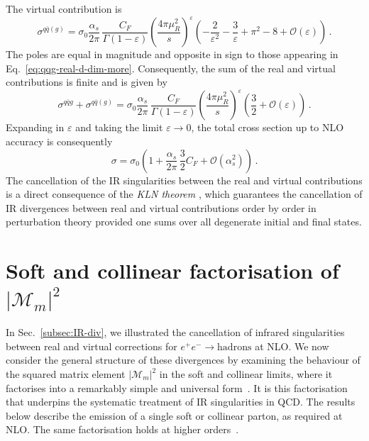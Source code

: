 The virtual contribution is
\begin{equation}
   \sigma^{q\bar{q}(g)}=\sigma_0\frac{\alpha_s}{2\pi}\,
      \frac{C_F}{\Gamma(1-\varepsilon)}
      \left(\frac{4\pi\mu_R^2}{s}\right)^{\varepsilon}
      \left(
         -\frac{2}{\varepsilon^2}
         -\frac{3}{\varepsilon}
         + \pi^2
         - 8
         + \mathcal{O}(\varepsilon)
      \right)\,.
\end{equation}
The poles are equal in magnitude and opposite in sign to those appearing
in Eq.~\eqref{eq:qqg-real-d-dim-more}. Consequently, the sum of the real
and virtual contributions is finite and is given by
\begin{equation}
\label{eq:Real-plus-Virt}
\sigma^{q\bar{q}g}+\sigma^{q\bar{q}(g)}=\sigma_0\frac{\alpha_s}{2\pi}\,
\frac{C_F}{\Gamma(1-\varepsilon)}
\left(\frac{4\pi\mu_R^2}{s}\right)^{\varepsilon}
\left(\frac{3}{2} + \mathcal{O}(\varepsilon)\right)\,.
\end{equation}
Expanding in $\varepsilon$ and taking the limit $\varepsilon\to0$,
the total cross section up to NLO accuracy is consequently
\begin{equation}
\label{eq:sigma-full}
\sigma
= \sigma_0
\left(
1 + \frac{\alpha_s}{2\pi}\,\frac{3}{2} C_F
+ \mathcal{O}(\alpha_s^2)
\right)\,.
\end{equation}
The cancellation of the IR singularities between the real and virtual
contributions is a direct consequence of the \emph{KLN theorem}
\cite{Kinoshita:1962ur, Lee:1964is}, which guarantees the cancellation
of IR divergences between real and virtual contributions 
order by order in perturbation theory provided one sums
over all degenerate initial and final states.

\section{Soft and collinear factorisation of $|\mathcal{M}_m|^2$}
\label{sec:M-factorisation}

In Sec.~\ref{subsec:IR-div}, we illustrated the cancellation of infrared
singularities between real and virtual corrections for $e^+e^- \to
\mathrm{hadrons}$ at NLO. We now consider the general structure of these
divergences by examining the behaviour of the squared matrix element
$|\mathcal{M}_m|^2$ in the soft and collinear limits, where it factorises into a
remarkably simple and universal form~\cite{Catani:1999ss}. It is this
factorisation that underpins the systematic treatment of IR singularities in
QCD. The results below describe the emission of a single soft or collinear
parton, as required at NLO. The same factorisation holds at higher
orders~\cite{Catani:1999ss,Colferai:2022jjf,Duhr:2013msa,Herzog:2023sgb}.

